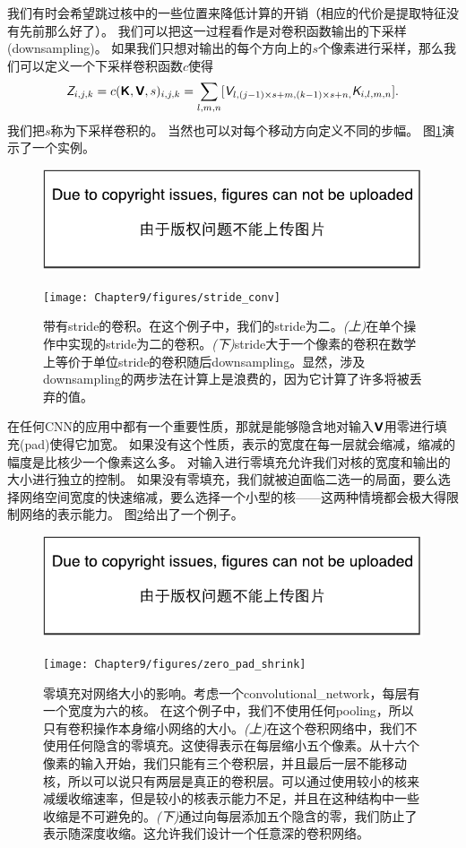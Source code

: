 我们有时会希望跳过核中的一些位置来降低计算的开销（相应的代价是提取特征没有先前那么好了）。
我们可以把这一过程看作是对卷积函数输出的下采样(downsampling)。
如果我们只想对输出的每个方向上的$s$个像素进行采样，那么我们可以定义一个下采样卷积函数$c$使得
\begin{equation}
\textit{\textsf{Z}}_{i,j,k} = c(\textsf{\textbf{K}}, \textsf{\textbf{V}}, s)_{i,j,k} = \sum_{l,m,n} [\textit{\textsf{V}}_{l,(j-1)\times s+m, (k-1)\times s +n,}
 \textit{\textsf{K}}_{i,l,m,n}].
 \label{eq:9.8}
\end{equation}
我们把$s$称为下采样卷积的。
当然也可以对每个移动方向定义不同的步幅。
图\ref{fig:chap9_stride_conv}演示了一个实例。
\begin{figure}[!htb]
\ifOpenSource
\centerline{\includegraphics{figure.pdf}}
\else
\centerline{\texttt{[image: Chapter9/figures/stride\_conv]}}
\fi
\caption{带有\gls{stride}的卷积。在这个例子中，我们的\gls{stride}为二。\emph{(上)}在单个操作中实现的\gls{stride}为二的卷积。\emph{(下)}\gls{stride}大于一个像素的卷积在数学上等价于单位\gls{stride}的卷积随后\gls{downsampling}。显然，涉及\gls{downsampling}的两步法在计算上是浪费的，因为它计算了许多将被丢弃的值。}
\label{fig:chap9_stride_conv}
\end{figure}

在任何\gls{CNN}的应用中都有一个重要性质，那就是能够隐含地对输入$\textsf{\textbf{V}}$用零进行填充(pad)使得它加宽。
如果没有这个性质，表示的宽度在每一层就会缩减，缩减的幅度是比核少一个像素这么多。
对输入进行零填充允许我们对核的宽度和输出的大小进行独立的控制。
如果没有零填充，我们就被迫面临二选一的局面，要么选择网络空间宽度的快速缩减，要么选择一个小型的核——这两种情境都会极大得限制网络的表示能力。
图\ref{fig:chap9_zero_pad_shrink}给出了一个例子。
\begin{figure}[!htb]
\ifOpenSource
\centerline{\includegraphics{figure.pdf}}
\else
\centerline{\texttt{[image: Chapter9/figures/zero\_pad\_shrink]}}
\fi
\caption{零填充对网络大小的影响。考虑一个\gls{convolutional_network}，每层有一个宽度为六的核。 在这个例子中，我们不使用任何\gls{pooling}，所以只有卷积操作本身缩小网络的大小。\emph{(上)}在这个卷积网络中，我们不使用任何隐含的零填充。这使得表示在每层缩小五个像素。从十六个像素的输入开始，我们只能有三个卷积层，并且最后一层不能移动核，所以可以说只有两层是真正的卷积层。可以通过使用较小的核来减缓收缩速率，但是较小的核表示能力不足，并且在这种结构中一些收缩是不可避免的。\emph{(下)}通过向每层添加五个隐含的零，我们防止了表示随深度收缩。这允许我们设计一个任意深的卷积网络。}
\label{fig:chap9_zero_pad_shrink}
\end{figure}

